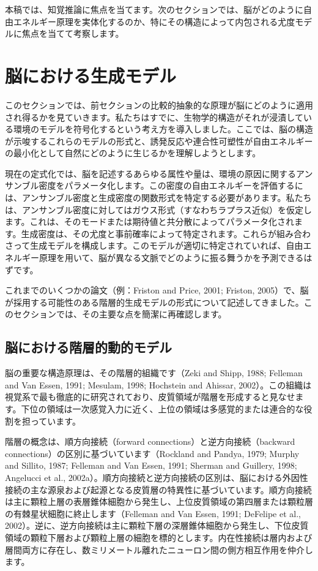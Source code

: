 \documentclass{article}
\begin{document}
本稿では、知覚推論に焦点を当てます。次のセクションでは、脳がどのように自由エネルギー原理を実体化するのか、特にその構造によって内包される尤度モデルに焦点を当てて考察します。


\section{脳における生成モデル}
このセクションでは、前セクションの比較的抽象的な原理が脳にどのように適用され得るかを見ていきます。私たちはすでに、生物学的構造がそれが浸漬している環境のモデルを符号化するという考え方を導入しました。ここでは、脳の構造が示唆するこれらのモデルの形式と、誘発反応や連合性可塑性が自由エネルギーの最小化として自然にどのように生じるかを理解しようとします。

現在の定式化では、脳を記述するあらゆる属性や量は、環境の原因に関するアンサンブル密度をパラメータ化します。この密度の自由エネルギーを評価するには、アンサンブル密度と生成密度の関数形式を特定する必要があります。私たちは、アンサンブル密度に対してはガウス形式（すなわちラプラス近似）を仮定します。これは、そのモードまたは期待値と共分散によってパラメータ化されます。生成密度は、その尤度と事前確率によって特定されます。これらが組み合わさって生成モデルを構成します。このモデルが適切に特定されていれば、自由エネルギー原理を用いて、脳が異なる文脈でどのように振る舞うかを予測できるはずです。

これまでのいくつかの論文（例：Friston and Price, 2001; Friston, 2005）で、脳が採用する可能性のある階層的生成モデルの形式について記述してきました。このセクションでは、その主要な点を簡潔に再確認します。

\subsection{脳における階層的動的モデル}
脳の重要な構造原理は、その階層的組織です（Zeki and Shipp, 1988; Felleman and Van Essen, 1991; Mesulam, 1998; Hochstein and Ahissar, 2002）。この組織は視覚系で最も徹底的に研究されており、皮質領域が階層を形成すると見なせます。下位の領域は一次感覚入力に近く、上位の領域は多感覚的または連合的な役割を担っています。

階層の概念は、順方向接続（forward connections）と逆方向接続（backward connections）の区別に基づいています（Rockland and Pandya, 1979; Murphy and Sillito, 1987; Felleman and Van Essen, 1991; Sherman and Guillery, 1998; Angelucci et al., 2002a）。順方向接続と逆方向接続の区別は、脳における外因性接続の主な源泉および起源となる皮質層の特異性に基づいています。順方向接続は主に顆粒上層の表層錐体細胞から発生し、上位皮質領域の第四層または顆粒層の有棘星状細胞に終止します（Felleman and Van Essen, 1991; DeFelipe et al., 2002）。逆に、逆方向接続は主に顆粒下層の深層錐体細胞から発生し、下位皮質領域の顆粒下層および顆粒上層の細胞を標的とします。内在性接続は層内および層間両方に存在し、数ミリメートル離れたニューロン間の側方相互作用を仲介します。
\end{document}
